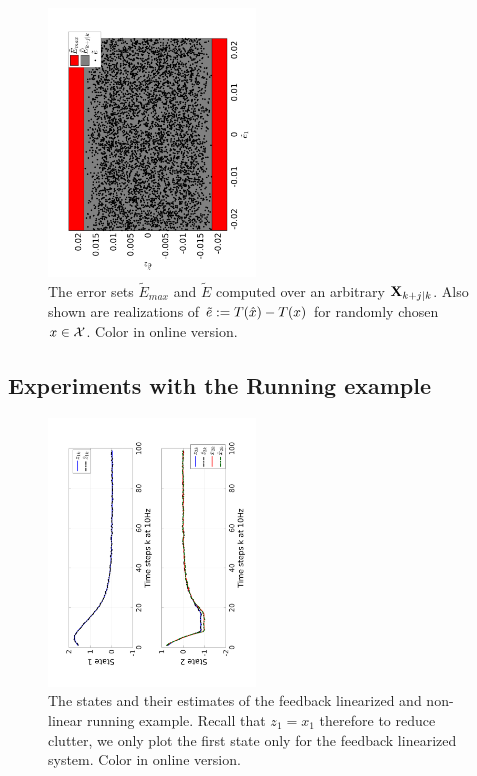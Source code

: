 
\begin{figure}
	\includegraphics[angle=270,width=0.49\textwidth]{figs/Err_Bounds_toy.pdf}
	\caption{The error sets $\tilde{E}_{max}$ and $\tilde{E}$ computed over an arbitrary $\mathbf{X}_{k+j|k}$. Also shown are realizations of $\tilde{e} := T(\hat{x}) - T(x)$ for randomly chosen $x \in \mathcal{X}$. Color in online version.}
	\label{fig:err_bound_toy}
\end{figure}

\subsection{Experiments with the Running example}

\begin{figure}
	\centering	
	\includegraphics[angle=270,width=0.49\textwidth]{figs/AllStates_toy.pdf}
	\caption{The states and their estimates of the feedback linearized and non-linear running example. Recall that $z_1 = x_1$ therefore to reduce clutter, we only plot the first state only for the feedback linearized system. Color in online version.}
	\label{fig:AllStates_toy}
\end{figure}

